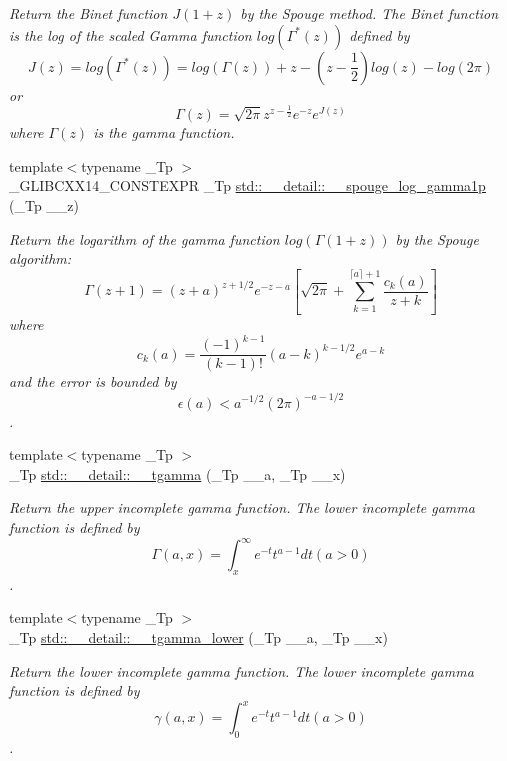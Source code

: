 \begin{DoxyCompactItemize}
\begin{DoxyCompactList}\small\item\em Return the Binet function $ J(1+z) $ by the Spouge method. The Binet function is the log of the scaled Gamma function $ log(\Gamma^*(z)) $ defined by \[ J(z) = log(\Gamma^*(z)) = log\left(\Gamma(z)\right) + z - \left(z-\frac{1}{2}\right) log(z) - log(2\pi) \] or \[ \Gamma(z) = \sqrt{2\pi}z^{z-\frac{1}{2}}e^{-z}e^{J(z)} \] where $ \Gamma(z) $ is the gamma function. \end{DoxyCompactList}\item 
{\footnotesize template$<$typename \+\_\+\+Tp $>$ }\\\+\_\+\+G\+L\+I\+B\+C\+X\+X14\+\_\+\+C\+O\+N\+S\+T\+E\+X\+PR \+\_\+\+Tp \hyperlink{namespacestd_1_1____detail_a29cdf96d3726e15cb0652736971ba5a9}{std\+::\+\_\+\+\_\+detail\+::\+\_\+\+\_\+spouge\+\_\+log\+\_\+gamma1p} (\+\_\+\+Tp \+\_\+\+\_\+z)
\begin{DoxyCompactList}\small\item\em Return the logarithm of the gamma function $ log(\Gamma(1+z)) $ by the Spouge algorithm\+: \[ \Gamma(z+1) = (z+a)^{z+1/2}e^{-z-a}\left[ \sqrt{2\pi} + \sum_{k=1}^{\lceil a \rceil + 1}\frac{c_k(a)}{z+k}\right] \] where \[ c_k(a) = \frac{(-1)^{k-1}}{(k-1)!}(a-k)^{k-1/2}e^{a-k} \] and the error is bounded by \[ \epsilon(a) < a^{-1/2}(2\pi)^{-a-1/2} \]. \end{DoxyCompactList}\item 
{\footnotesize template$<$typename \+\_\+\+Tp $>$ }\\\+\_\+\+Tp \hyperlink{namespacestd_1_1____detail_ad2f6546e22348b07d992d522153d7d6b}{std\+::\+\_\+\+\_\+detail\+::\+\_\+\+\_\+tgamma} (\+\_\+\+Tp \+\_\+\+\_\+a, \+\_\+\+Tp \+\_\+\+\_\+x)
\begin{DoxyCompactList}\small\item\em Return the upper incomplete gamma function. The lower incomplete gamma function is defined by \[ \Gamma(a,x) = \int_x^\infty e^{-t}t^{a-1}dt (a > 0) \]. \end{DoxyCompactList}\item 
{\footnotesize template$<$typename \+\_\+\+Tp $>$ }\\\+\_\+\+Tp \hyperlink{namespacestd_1_1____detail_ad85ad5ffdb1bab9b1e3b6fd7a114fb0d}{std\+::\+\_\+\+\_\+detail\+::\+\_\+\+\_\+tgamma\+\_\+lower} (\+\_\+\+Tp \+\_\+\+\_\+a, \+\_\+\+Tp \+\_\+\+\_\+x)
\begin{DoxyCompactList}\small\item\em Return the lower incomplete gamma function. The lower incomplete gamma function is defined by \[ \gamma(a,x) = \int_0^x e^{-t}t^{a-1}dt (a > 0) \]. \end{DoxyCompactList}\end{DoxyCompactItemize}
